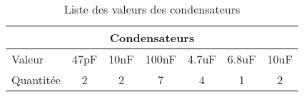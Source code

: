 \begin{table}[]
\centering
\begin{tabular}{|lcccccc|}
\hline
\multicolumn{7}{|c|}{\textbf{Condensateurs}} \\ \hline
\multicolumn{1}{|l|}{Valeur} &
  \multicolumn{1}{c|}{47pF} &
  \multicolumn{1}{c|}{10nF} &
  \multicolumn{1}{c|}{100nF} &
  \multicolumn{1}{c|}{4.7uF} &
  \multicolumn{1}{c|}{6.8uF} &
  10uF \\ \hline
\multicolumn{1}{|l|}{Quantitée} &
  \multicolumn{1}{c|}{2} &
  \multicolumn{1}{c|}{2} &
  \multicolumn{1}{c|}{7} &
  \multicolumn{1}{c|}{4} &
  \multicolumn{1}{c|}{1} &
  2 \\ \hline
\end{tabular}
\caption{Liste des valeurs des condensateurs}
\label{tab:Bom_Capa}
\end{table}